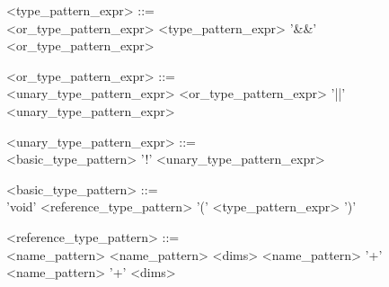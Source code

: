 \begin{minipage}{6in}
\begin{blue}
\begin{grammar}
<type_pattern_expr> ::= \hspace{1in} \\
     <or_type_pattern_expr>
\alt <type_pattern_expr> '\&\&' <or_type_pattern_expr>

<or_type_pattern_expr> ::= \hspace{1in} \\
     <unary_type_pattern_expr>
\alt <or_type_pattern_expr> '||' <unary_type_pattern_expr>

<unary_type_pattern_expr> ::= \hspace{1in} \\
     <basic_type_pattern>
\alt '!' <unary_type_pattern_expr>

<basic_type_pattern> ::=  \hspace{1in} \\
     'void'
\alt <reference_type_pattern>
\alt '(' <type_pattern_expr> ')'

<reference_type_pattern> ::= \hspace{1in} \\
     <name_pattern>
\alt <name_pattern> {\red <dims>}
\alt <name_pattern> '+'
\alt <name_pattern> '+' {\red <dims>}
\end{grammar}
\end{blue}
\end{minipage}

